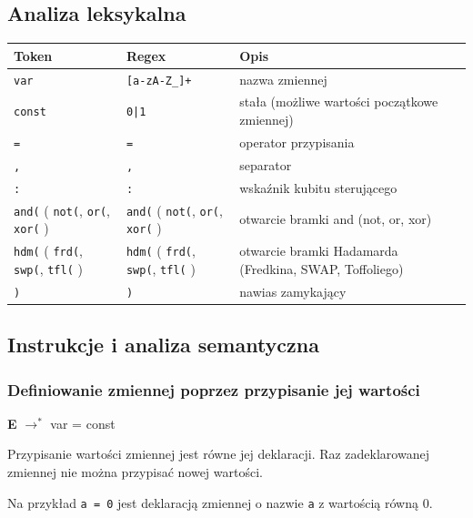 \subsection{Analiza leksykalna}
\begin{center}
    \begin{tabular}{|m{4cm}|m{4cm}|p{7cm}|}
        \hline
        Token & Regex & Opis \\
        \hline
        \texttt{var} & \texttt{[a-zA-Z\_]+} & nazwa zmiennej\\
        \texttt{const} & \texttt{0|1} & stała (możliwe wartości początkowe zmiennej)\\
        \texttt{=} & \texttt{=} & operator przypisania\\
        \texttt{,} & \texttt{,} & separator\\
        \texttt{:} & \texttt{:} & wskaźnik kubitu sterującego\\
        \texttt{and(} ( \texttt{not(}, \texttt{or(}, \texttt{xor(} ) & \texttt{and(} ( \texttt{not(}, \texttt{or(}, \texttt{xor(} ) & otwarcie bramki and (not, or, xor)\\
        \texttt{hdm(} ( \texttt{frd(}, \texttt{swp(}, \texttt{tfl(} ) & \texttt{hdm(} ( \texttt{frd(}, \texttt{swp(}, \texttt{tfl(} ) & otwarcie bramki Hadamarda (Fredkina, SWAP, Toffoliego)\\
        \texttt{)} & \texttt{)} & nawias zamykający \\
        \hline
    \end{tabular}
\end{center}
\subsection{Instrukcje i analiza semantyczna}
\subsubsection{Definiowanie zmiennej poprzez przypisanie jej wartości}
\begin{center}
    \textbf{E} $\rightarrow^*$ var = const
\end{center}
Przypisanie wartości zmiennej jest równe jej deklaracji. Raz zadeklarowanej zmiennej nie można przypisać nowej wartości.
\par Na przykład \texttt{a = 0} jest deklaracją zmiennej o nazwie \texttt{a} z wartością równą 0.
